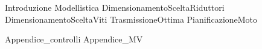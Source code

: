 \documentclass{miaclasse}
\begin{document}
\primapag

\pagestyle{fancy}







{Introduzione}
{Modellistica}
{DimensionamentoSceltaRiduttori}
{DimensionamentoSceltaViti}
{TrasmissioneOttima}
{PianificazioneMoto}

\appendix
{Appendice_controlli}
{Appendice_MV}
\end{document}
